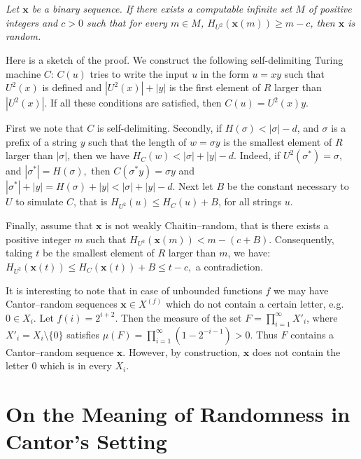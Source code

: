 \documentclass{elsart}
\begin{document}
 \begin{center}
 \it
 Let ${\mathbf x}$ be a binary sequence. If there exists a computable infinite set
 $M$ of positive integers and $c>0$ such that for every $m\in M$, $H_{U^{2}}({\mathbf x}(m))
 \ge m-c$, then ${\mathbf x}$ is random.
 \end{center}
Here is a sketch of the proof. We construct the
following self-delimiting Turing  machine $C$: $C(u)$ tries to write the input $u$ in the form
$u=xy$ such that $U^{2}(x)$ is  defined and $|U^{2}(x)| + |y|$ is the first element of  $ R$  larger than $|U^{2}(x)|$. If all these conditions are satisfied, then $C(u) = U^{2}(x)y$.

First we note  that $C$ is self-delimiting. Secondly, if $H(\sigma) <  |\sigma| - d$,
and $\sigma$ is a prefix of a string $y$ such that the length of $w = \sigma y $  is the smallest element of $R$ larger than $|\sigma|$, then we have $H_C(w) <  | \sigma | + |y| - d$. Indeed, if $U^{2}(\sigma^*) = \sigma,$ and $|\sigma^*| = H(\sigma),$ then
$C( \sigma^*y) = \sigma y$ and $|\sigma^*| +  |y| =  H(\sigma) + |y| <  |\sigma| + |y| -d.$  Next let $B$ be the constant necessary to $U$ to simulate  $C$, that is
$H_{U^{2}}(u) \le H_C(u) + B$, for all strings $u$.

Finally, assume that ${\mathbf x}$ is not weakly  Chaitin--random, that is there exists a positive integer $m$ such that $H_{U^{2}}({\mathbf x}(m)) < m - (c+B)$. Consequently, taking  $t$ be the smallest element of $R$ larger than $m$, we have:  $H_{U^{2}}({\mathbf x}(t)) \leq
H_C ({\mathbf x}(t)) + B  \le  t -c,$ a contradiction.


It is interesting to note that in case of unbounded functions $f$ we
may have Cantor--random sequences ${\mathbf x}\in {X^{(f)}}$ which do not contain a
certain letter, e.g. $0\in X_i$.
Let $f(i)= 2^{i+2}$. Then the measure of the set $F=
\prod_{i=1}^\infty X'_i$, where $X'_i=X_i\setminus \{0\}$ satisfies
$\mu(F) = \prod_{i=1}^\infty (1- 2^{-i-1})>0$. Thus $F$ contains a
Cantor--random sequence ${\mathbf x}$.
However, by construction, ${\mathbf x}$ does not contain the letter $0$ which is in every $X_i$.


\section{On the Meaning of Randomness in Cantor's Setting}
\end{document}
